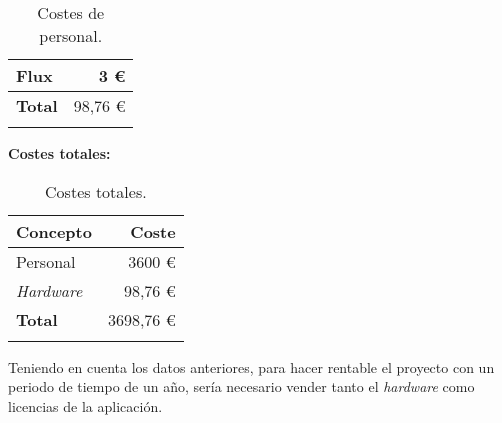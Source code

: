\begin{longtable}[]{@{}lr@{}}
\begin{minipage}[t]{0.38\columnwidth}
Flux\strut
\end{minipage} & \begin{minipage}[t]{0.20\columnwidth}\raggedright\strut
3 \euro{}\strut
\end{minipage}\tabularnewline
\midrule
\begin{minipage}[t]{0.38\columnwidth}\raggedright\strut
\textbf{Total}\strut
\end{minipage} & \begin{minipage}[t]{0.20\columnwidth}\raggedright\strut
98,76 \euro{}\strut
\end{minipage}\tabularnewline
\bottomrule
\caption{Costes de personal.}
\end{longtable}



\textbf{Costes totales:}

\begin{longtable}[]{@{}lr@{}}
\toprule
\begin{minipage}[b]{0.38\columnwidth}\raggedright\strut
\textbf{Concepto}\strut
\end{minipage} & \begin{minipage}[b]{0.20\columnwidth}\raggedright\strut
\textbf{Coste}\strut
\end{minipage}\tabularnewline
\midrule
\endhead
\begin{minipage}[t]{0.38\columnwidth}\raggedright\strut
Personal\strut
\end{minipage} & \begin{minipage}[t]{0.20\columnwidth}\raggedright\strut
3600 \euro{}\strut
\end{minipage}\tabularnewline
\begin{minipage}[t]{0.38\columnwidth}\raggedright\strut
\emph{Hardware}\strut
\end{minipage} & \begin{minipage}[t]{0.20\columnwidth}\raggedright\strut
98,76 \euro{}\strut
\end{minipage}\tabularnewline
\midrule
\begin{minipage}[t]{0.38\columnwidth}\raggedright\strut
\textbf{Total}\strut
\end{minipage} & \begin{minipage}[t]{0.20\columnwidth}\raggedright\strut
3698,76 \euro{}\strut
\end{minipage}\tabularnewline
\bottomrule
\caption{Costes totales.}
\end{longtable}

Teniendo en cuenta los datos anteriores, para hacer rentable el proyecto con un periodo de tiempo de un año, sería necesario vender tanto el \emph{hardware} como licencias de la aplicación. 

